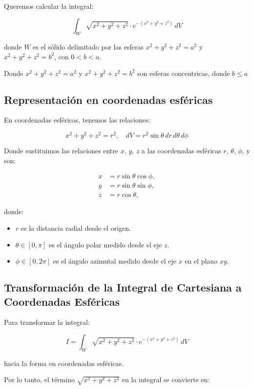 

Queremos calcular la integral:

\[
\int_{W} \sqrt{x^2 + y^2 + z^2} \cdot e^{-(x^2 + y^2 + z^2)} \, dV
\]

donde \( W \) es el sólido delimitado por las esferas \( x^2 + y^2 + z^2 = a^2 \) y \( x^2 + y^2 + z^2 = b^2 \), con \( 0 < b < a \).

Donde \( x^2 + y^2 + z^2 = a^2 \) y \( x^2 + y^2 + z^2 = b^2 \) son esferas concentricas, donde \( b \leq a \)

\subsection*{Representación en coordenadas esféricas}

En coordenadas esféricas, tenemos las relaciones:

\[
x^2 + y^2 + z^2 = r^2, \quad dV = r^2 \sin\theta \, dr \, d\theta \, d\phi
\]

Donde sustituimos las relaciones entre \(x\), \(y\), \(z\) a las coordenadas esféricas \(r\), \(\theta\), \(\phi\), y son:

\[
\begin{aligned}
x &= r \sin\theta \cos\phi, \\
y &= r \sin\theta \sin\phi, \\
z &= r \cos\theta,
\end{aligned}
\]

donde:
\begin{itemize}
    \item \(r\) es la distancia radial desde el origen.
    \item \(\theta \in [0, \pi]\) es el ángulo polar medido desde el eje \(z\).
    \item \(\phi \in [0, 2\pi]\) es el ángulo azimutal medido desde el eje \(x\) en el plano \(xy\).
\end{itemize}

\subsection*{Transformación de la Integral de Cartesiana a Coordenadas Esféricas}

Para transformar la integral:

\[
I =\int_{W} \sqrt{x^2 + y^2 + z^2} \cdot e^{-(x^2 + y^2 + z^2)} \, dV
\]

hacia la forma en coordenadas esféricas.

Por lo tanto, el término \(\sqrt{x^2 + y^2 + z^2}\) en la integral se convierte en:

